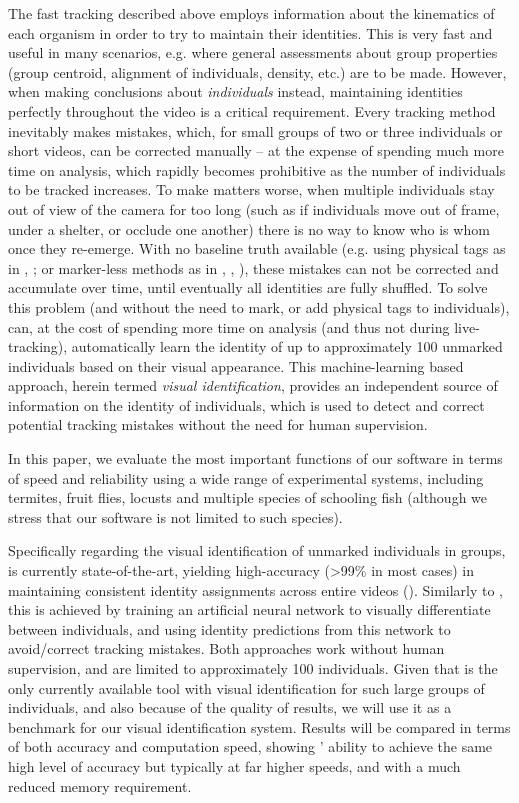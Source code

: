 \documentclass[9pt,lineno]{elife}
\newcommand{\idtracker}{\protect\path{ idtracker.ai}}
\newcommand{\TRex}{\protect\path{TRex}}
\newcommand{\changemade}[1]{#1}
\begin{document}
The fast tracking described above employs information about the kinematics of each organism in order to try to maintain their identities. This is very fast and useful in many scenarios, e.g. where general assessments about group properties (group centroid, alignment of individuals, density, etc.) are to be made. However, when making conclusions about \textit{individuals} instead, maintaining identities perfectly throughout the video is a critical requirement. Every tracking method inevitably makes mistakes, which, for small groups of two or three individuals or short videos, can be corrected manually -- at the expense of spending much more time on analysis, which rapidly becomes prohibitive as the number of individuals to be tracked increases. To make matters worse, when multiple individuals stay out of view of the camera for too long (such as if individuals move out of frame, under a shelter, or occlude one another) there is no way to know who is whom once they re-emerge. With no baseline truth available (e.g. using physical tags as in \cite{alarcon2018automated}, \cite{nagy2013context}; or marker-less methods as in \cite{idtracker}, \cite{idtrackerai}, \cite{rasch2016closing}), these mistakes can not be corrected and accumulate over time, until eventually all identities are fully shuffled. To solve this problem (and without the need to mark, or add physical tags to individuals), \TRex{} can, at the cost of spending more time on analysis (and thus not during live-tracking), automatically learn the identity of up to approximately 100 unmarked individuals based on their visual appearance. This machine-learning based approach, herein termed \textit{visual identification}, provides an independent source of information on the identity of individuals, which is used to detect and correct potential tracking mistakes without the need for human supervision.

\changemade{In this paper, we evaluate the most important functions of our software} in terms of speed and reliability using a wide range of experimental systems, including termites, fruit flies, locusts and multiple species of schooling fish (although we stress that our software is not limited to such species).

Specifically regarding the visual identification of unmarked individuals in groups, \idtracker{} is currently state-of-the-art, yielding high-accuracy (>99\% in most cases) in maintaining consistent identity assignments across entire videos (\cite{idtrackerai}). Similarly to \TRex{}, this is achieved by training an artificial neural network to visually differentiate between individuals, and using identity predictions from this network to avoid/correct tracking mistakes. Both approaches work without human supervision, and are limited to approximately 100 individuals. Given that \idtracker{} is the only currently available tool with visual identification for such large groups of individuals, and also because of the quality of results, we will use it as a benchmark for our visual identification system. Results will be compared in terms of both accuracy and computation speed, showing \TRex{}' ability to achieve the same high level of accuracy but typically at far higher speeds, and with a much reduced memory requirement.
\end{document}
